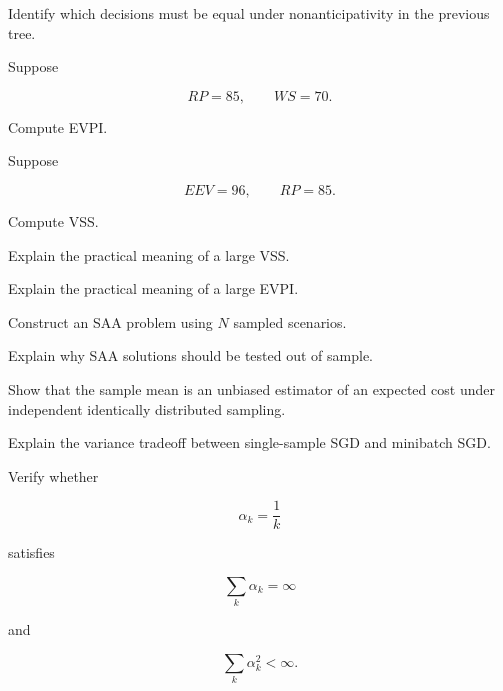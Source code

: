 \begin{exercise}[3]
Identify which decisions must be equal under nonanticipativity in the
previous tree.
\end{exercise}

\begin{exercise}[3]
Suppose

\[
RP=85,
\qquad
WS=70.
\]

Compute EVPI.
\end{exercise}

\begin{exercise}[3]
Suppose

\[
EEV=96,
\qquad
RP=85.
\]

Compute VSS.
\end{exercise}

\begin{exercise}[3]
Explain the practical meaning of a large VSS.
\end{exercise}

\begin{exercise}[3]
Explain the practical meaning of a large EVPI.
\end{exercise}

\begin{exercise}[3]
Construct an SAA problem using \(N\) sampled scenarios.
\end{exercise}

\begin{exercise}[3]
Explain why SAA solutions should be tested out of sample.
\end{exercise}

\begin{exercise}[3]
Show that the sample mean is an unbiased estimator of an expected cost
under independent identically distributed sampling.
\end{exercise}

\begin{exercise}[3]
Explain the variance tradeoff between single-sample SGD and minibatch SGD.
\end{exercise}

\begin{exercise}[3]
Verify whether

\[
\alpha_k=\frac1k
\]

satisfies

\[
\sum_k\alpha_k=\infty
\]

and

\[
\sum_k\alpha_k^2<\infty.
\]
\end{exercise}

